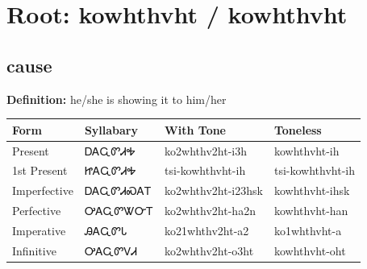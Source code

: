 \documentclass{article}%
\begin{document}
%
\normalsize%
\section*{Root: kowhthvht / kowhthvht}%
\subsection*{cause}%
\textbf{Definition: }%
he/she is showing it to him/her%
\\[0.5em]%
\begin{tabular}{|l|l|l|l|}%
\hline%
\textbf{Form}&\textbf{Syllabary}&\textbf{With Tone}&\textbf{Toneless}\\%
\hline%
Present&ᎠᎪᏩᏛᏗᎭ&ko2whthv2ht{-}i3h&kowhthvht{-}ih\\%
1st Present&ᏥᎪᏩᏛᏗᎭ&tsi{-}kowhthvht{-}ih&tsi{-}kowhthvht{-}ih\\%
Imperfective&ᎠᎪᏩᏛᏗᏍᎪᎢ&ko2whthv2ht{-}i23hsk&kowhthvht{-}ihsk\\%
Perfective&ᎤᎪᏩᏛᏔᏅᎢ&ko2whthv2ht{-}ha2n&kowhthvht{-}han\\%
Imperative&ᎯᎪᏩᏛᏓ&ko21whthv2ht{-}a2&ko1whthvht{-}a\\%
Infinitive&ᎤᎪᏩᏛᏙᏗ&ko2whthv2ht{-}o3ht&kowhthvht{-}oht\\%
\hline%
\end{tabular}%
\\[1em]%
\end{document}
